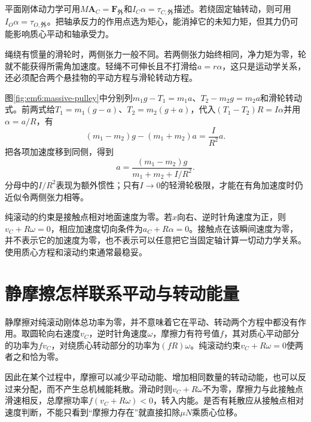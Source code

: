 平面刚体动力学可用$M\bm A_C=\bm F_{\text{外}}$和$I_C\alpha=\tau_{C,\text{外}}$描述。若绕固定轴转动，则可用$I_O\alpha=\tau_{O,\text{外}}$。把轴承反力的作用点选为矩心，能消掉它的未知力矩，但其力仍可能影响质心平动和轴承受力。

绳绕有惯量的滑轮时，两侧张力一般不同。若两侧张力始终相同，净力矩为零，轮就不能获得所需角加速度。轻绳不可伸长且不打滑给$a=r\alpha$，这只是运动学关系，还必须配合两个悬挂物的平动方程与滑轮转动方程。

图\ref{fig:em6:massive-pulley}中分别列$m_1g-T_1=m_1a$、$T_2-m_2g=m_2a$和滑轮转动式。前两式给$T_1=m_1(g-a)$、$T_2=m_2(g+a)$，代入$(T_1-T_2)R=I\alpha$并用$\alpha=a/R$，有
\[
 (m_1-m_2)g-(m_1+m_2)a=\frac{I}{R^2}a.
\]
把各项加速度移到同侧，得到
\[
 a=\frac{(m_1-m_2)g}{m_1+m_2+I/R^2}.
\]
分母中的$I/R^2$表现为额外惯性；只有$I\to0$的轻滑轮极限，才能在有角加速度时仍近似令两侧张力相等。


纯滚动的约束是接触点相对地面速度为零。若$x$向右、逆时针角速度为正，则$v_C+R\omega=0$，相应加速度切向条件为$a_C+R\alpha=0$。接触点在该瞬间速度为零，并不表示它的加速度为零，也不表示可以任意把它当固定轴计算一切动力学关系。使用质心方程和滚动约束通常最稳妥。

\section{静摩擦怎样联系平动与转动能量}

静摩擦对纯滚动刚体总功率为零，并不意味着它在平动、转动两个方程中都没有作用。取圆轮向右速度$v_C$，逆时针角速度$\omega$，摩擦力有符号值$f$，其对质心平动部分的功率为$fv_C$，对绕质心转动部分的功率为$(fR)\omega$。纯滚动约束$v_C+R\omega=0$使两者之和恰为零。

因此在某个过程中，摩擦可以减少平动动能、增加相同数量的转动动能，也可以反过来分配，而不产生总机械能耗散。滑动时则$v_C+R\omega$不为零，摩擦力与此接触点滑速相反，总摩擦功率$f(v_C+R\omega)<0$，转入内能。是否有耗散应从接触点相对速度判断，不能只看到“摩擦力存在”就直接扣除$\mu N$乘质心位移。

